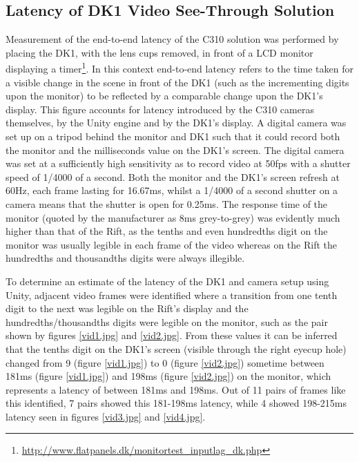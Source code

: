
\subsection{Latency of DK1 Video See-Through Solution}

Measurement of the end-to-end latency of the C310 solution was performed by placing the DK1, with the lens cups removed, in front of a LCD monitor displaying a timer\footnote{\url{http://www.flatpanels.dk/monitortest_inputlag_dk.php}}. In this context end-to-end latency refers to the time taken for a visible change in the scene in front of the DK1 (such as the incrementing digits upon the monitor) to be reflected by a comparable change upon the DK1's display. This figure accounts for latency introduced by the C310 cameras themselves, by the Unity engine and by the DK1's display. A digital camera was set up on a tripod behind the monitor and DK1 such that it could record both the monitor and the milliseconds value on the DK1's screen. The digital camera was set at a sufficiently high sensitivity as to record video at 50fps with a shutter speed of 1/4000 of a second. Both the monitor and the DK1's screen refresh at 60Hz, each frame lasting for 16.67ms, whilst a 1/4000 of a second shutter on a camera means that the shutter is open for 0.25ms. The response time of the monitor (quoted by the manufacturer as 8ms grey-to-grey) was evidently much higher than that of the Rift, as the tenths and even hundredths digit on the monitor was usually legible in each frame of the video whereas on the Rift the hundredths and thousandths digits were always illegible.

To determine an estimate of the latency of the DK1 and camera setup using Unity, adjacent video frames were identified where a transition from one tenth digit to the next was legible on the Rift's display and the hundredths/thousandths digits were legible on the monitor, such as the pair shown by figures \ref{vid1.jpg} and \ref{vid2.jpg}. From these values it can be inferred that the tenths digit on the DK1's screen (visible through the right eyecup hole) changed from 9 (figure \ref{vid1.jpg}) to 0 (figure \ref{vid2.jpg}) sometime between 181ms (figure \ref{vid1.jpg}) and 198ms (figure \ref{vid2.jpg}) on the monitor, which represents a latency of between 181ms and 198ms. Out of 11 pairs of frames like this identified, 7 pairs showed this 181-198ms latency, while 4 showed 198-215ms latency seen in figures \ref{vid3.jpg} and \ref{vid4.jpg}.

